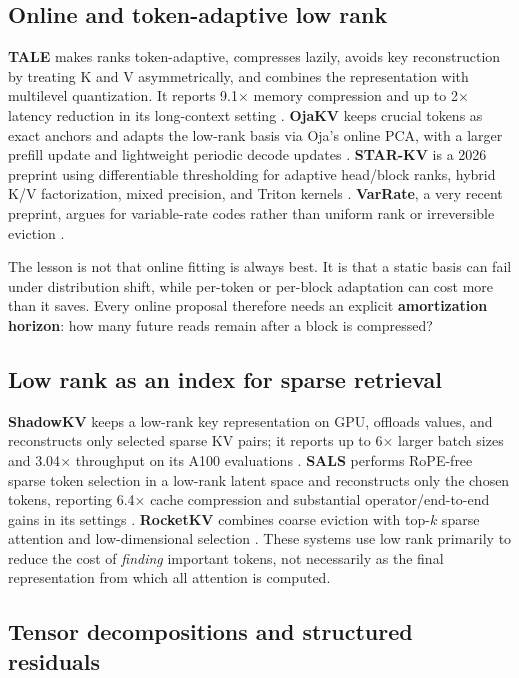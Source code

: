 \documentclass[10pt]{article}
\newcommand{\term}[1]{\textbf{\color{accent!85!black}#1}}
\begin{document}
\subsection{Online and token-adaptive low rank}

\textbf{TALE} makes ranks token-adaptive, compresses lazily, avoids key reconstruction by treating
K and V asymmetrically, and combines the representation with multilevel quantization. It reports
9.1$\times$ memory compression and up to 2$\times$ latency reduction in its long-context setting
\cite{tale}. \textbf{OjaKV} keeps crucial tokens as exact anchors and adapts the low-rank basis via
Oja's online PCA, with a larger prefill update and lightweight periodic decode updates
\cite{ojakv}. \textbf{STAR-KV} is a 2026 preprint using differentiable thresholding for adaptive
head/block ranks, hybrid K/V factorization, mixed precision, and Triton kernels \cite{starkv}.
\textbf{VarRate}, a very recent preprint, argues for variable-rate codes rather than uniform rank
or irreversible eviction \cite{varrate}.

The lesson is not that online fitting is always best. It is that a static basis can fail under
distribution shift, while per-token or per-block adaptation can cost more than it saves. Every
online proposal therefore needs an explicit \term{amortization horizon}: how many future reads
remain after a block is compressed?

\subsection{Low rank as an index for sparse retrieval}

\textbf{ShadowKV} keeps a low-rank key representation on GPU, offloads values, and reconstructs
only selected sparse KV pairs; it reports up to 6$\times$ larger batch sizes and 3.04$\times$
throughput on its A100 evaluations \cite{shadowkv}. \textbf{SALS} performs RoPE-free sparse token
selection in a low-rank latent space and reconstructs only the chosen tokens, reporting
6.4$\times$ cache compression and substantial operator/end-to-end gains in its settings
\cite{sals}. \textbf{RocketKV} combines coarse eviction with top-$k$ sparse attention and
low-dimensional selection \cite{rocketkv}. These systems use low rank primarily to reduce the
cost of \emph{finding} important tokens, not necessarily as the final representation from which
all attention is computed.

\subsection{Tensor decompositions and structured residuals}
\end{document}
